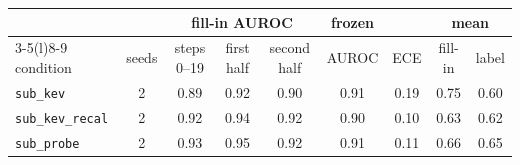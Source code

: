 \begin{tabular}{@{}lcccccccc@{}}
\toprule
 & & \multicolumn{3}{c}{fill-in AUROC} & frozen \kev{} & & \multicolumn{2}{c}{mean} \\ \cmidrule(lr){3-5}\cmidrule(l){8-9}
condition & seeds & steps 0--19 & first half & second half & AUROC & ECE & fill-in & label \\ \midrule
\texttt{sub\_kev} & 2 & 0.89 & 0.92 & 0.90 & 0.91 & 0.19 & 0.75 & 0.60 \\
\texttt{sub\_kev\_recal} & 2 & 0.92 & 0.94 & 0.92 & 0.90 & 0.10 & 0.63 & 0.62 \\
\texttt{sub\_probe} & 2 & 0.93 & 0.95 & 0.92 & 0.91 & 0.11 & 0.66 & 0.65 \\
\bottomrule
\end{tabular}
